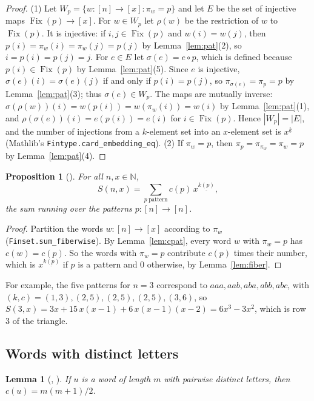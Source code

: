\documentclass[11pt]{amsart}
\theoremstyle{plain}
\newtheorem{lemma}[theorem]{Lemma}
\newtheorem{proposition}[theorem]{Proposition}
\theoremstyle{definition}
\newcommand{\N}{\mathbb{N}}
\newcommand{\Fix}{\operatorname{Fix}}
\newcommand{\ff}[2]{#1^{\underline{#2}}}
\begin{document}
\begin{proof}
(1) Let $W_p=\{w\colon[n]\to[x] : \pi_w=p\}$ and let $E$ be the set of injective maps $\Fix(p)\to[x]$. For $w\in W_p$ let $\rho(w)$ be the restriction of $w$ to $\Fix(p)$. It is injective: if $i,j\in\Fix(p)$ and $w(i)=w(j)$, then $p(i)=\pi_w(i)=\pi_w(j)=p(j)$ by Lemma~\ref{lem:pat}(2), so $i=p(i)=p(j)=j$. For $e\in E$ let $\sigma(e)=e\circ p$, which is defined because $p(i)\in\Fix(p)$ by Lemma~\ref{lem:pat}(5). Since $e$ is injective, $\sigma(e)(i)=\sigma(e)(j)$ if and only if $p(i)=p(j)$, so $\pi_{\sigma(e)}=\pi_p=p$ by Lemma~\ref{lem:pat}(3); thus $\sigma(e)\in W_p$. The maps are mutually inverse: $\sigma(\rho(w))(i)=w(p(i))=w(\pi_w(i))=w(i)$ by Lemma~\ref{lem:pat}(1), and $\rho(\sigma(e))(i)=e(p(i))=e(i)$ for $i\in\Fix(p)$. Hence $|W_p|=|E|$, and the number of injections from a $k$-element set into an $x$-element set is $\ff xk$ (Mathlib's \texttt{Fintype.card\_embedding\_eq}).
(2) If $\pi_w=p$, then $\pi_p=\pi_{\pi_w}=\pi_w=p$ by Lemma~\ref{lem:pat}(4).
\end{proof}

\begin{proposition}[]\label{prop:formula}
For all $n,x\in\N$,
\[
  S(n,x)=\sum_{p\ \text{pattern}} c(p)\,\ff x{k(p)},
\]
the sum running over the patterns $p\colon[n]\to[n]$.
\end{proposition}

\begin{proof}
Partition the words $w\colon[n]\to[x]$ according to $\pi_w$ (\texttt{Finset.sum\_fiberwise}). By Lemma~\ref{lem:cpat}, every word $w$ with $\pi_w=p$ has $c(w)=c(p)$. So the words with $\pi_w=p$ contribute $c(p)$ times their number, which is $\ff x{k(p)}$ if $p$ is a pattern and $0$ otherwise, by Lemma~\ref{lem:fiber}.
\end{proof}

For example, the five patterns for $n=3$ correspond to $aaa,aab,aba,abb,abc$, with $(k,c)=(1,3),(2,5),(2,5),(2,5),(3,6)$, so $S(3,x)=3x+15\,x(x-1)+6\,x(x-1)(x-2)=6x^3-3x^2$, which is row $3$ of the triangle.

\subsection{Words with distinct letters}

\begin{lemma}[, ]\label{lem:nodup}
If $u$ is a word of length $m$ with pairwise distinct letters, then $c(u)=m(m+1)/2$.
\end{lemma}
\end{document}
